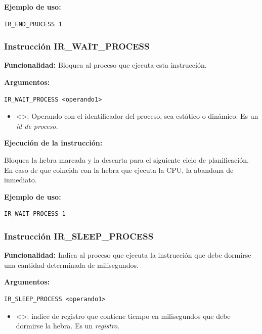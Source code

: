 \noindent
\textbf{Ejemplo de uso:}
\begin{verbatim}
IR_END_PROCESS 1
\end{verbatim}

\subsubsection{Instrucción IR\_WAIT\_PROCESS}\label{subsubsec:IR_WAIT_PROCESS}
\noindent
\textbf{Funcionalidad:} Bloquea al proceso que ejecuta esta instrucción.

\noindent
\textbf{Argumentos:}
\begin{verbatim}
IR_WAIT_PROCESS <operando1>
\end{verbatim}
\begin{itemize}
    \item <>: Operando con el identificador del proceso, sea estático o dinámico. Es un \textit{id de proceso}.
\end{itemize}

\noindent
\textbf{Ejecución de la instrucción:}
\vspace{0.3cm}

\noindent
Bloquea la hebra marcada y la descarta para el siguiente ciclo de planificación. En caso de que coincida con la hebra que ejecuta la CPU, la abandona de inmediato.
\vspace{0.3cm}

\noindent
\textbf{Ejemplo de uso:}
\begin{verbatim}
IR_WAIT_PROCESS 1
\end{verbatim}

\subsubsection{Instrucción IR\_SLEEP\_PROCESS}\label{subsubsec:IR_SLEEP_PROCESS}
\noindent
\textbf{Funcionalidad:} Indica al proceso que ejecuta la instrucción que debe dormirse una cantidad determinada de milisegundos.

\noindent
\textbf{Argumentos:}
\begin{verbatim}
IR_SLEEP_PROCESS <operando1>
\end{verbatim}
\begin{itemize}
    \item <>: índice de registro que contiene tiempo en milisegundos que debe dormirse la hebra. Es un \textit{registro}.
\end{itemize}

